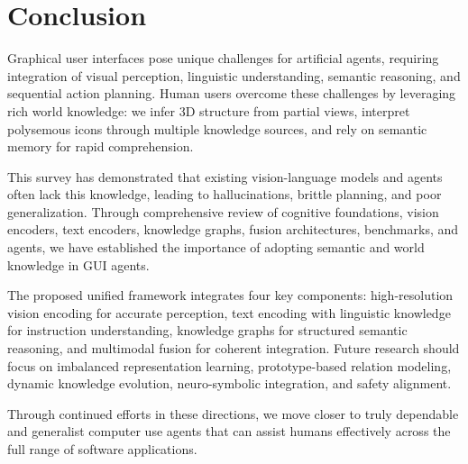 \documentclass[11pt]{article}
\begin{document}
\section{Conclusion}
\label{sec:conclusion}

Graphical user interfaces pose unique challenges for artificial agents, requiring integration of visual perception, linguistic understanding, semantic reasoning, and sequential action planning. Human users overcome these challenges by leveraging rich world knowledge: we infer 3D structure from partial views, interpret polysemous icons through multiple knowledge sources, and rely on semantic memory for rapid comprehension.

This survey has demonstrated that existing vision-language models and agents often lack this knowledge, leading to hallucinations, brittle planning, and poor generalization. Through comprehensive review of cognitive foundations, vision encoders, text encoders, knowledge graphs, fusion architectures, benchmarks, and agents, we have established the importance of adopting semantic and world knowledge in GUI agents.

The proposed unified framework integrates four key components: high-resolution vision encoding for accurate perception, text encoding with linguistic knowledge for instruction understanding, knowledge graphs for structured semantic reasoning, and multimodal fusion for coherent integration. Future research should focus on imbalanced representation learning, prototype-based relation modeling, dynamic knowledge evolution, neuro-symbolic integration, and safety alignment.

Through continued efforts in these directions, we move closer to truly dependable and generalist computer use agents that can assist humans effectively across the full range of software applications.
\end{document}
